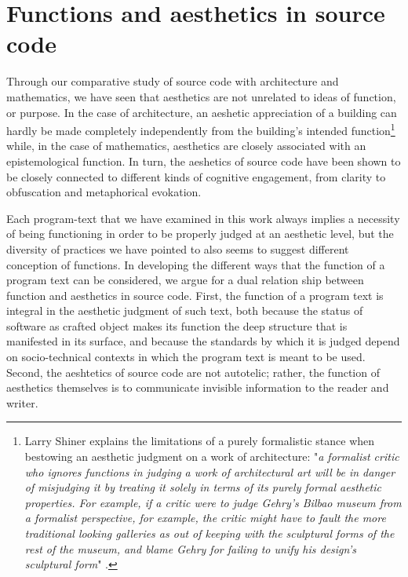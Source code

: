 \section{Functions and aesthetics in source code} 
\label{sec:functions-aesthetics-source-code}

Through our comparative study of source code with architecture and mathematics, we have seen that aesthetics are not unrelated to ideas of function, or purpose. In the case of architecture, an aeshetic appreciation of a building can hardly be made completely independently from the building's intended function\footnote{Larry Shiner explains the limitations of a purely formalistic stance when bestowing an aesthetic judgment on a work of architecture: "\emph{a formalist critic who ignores functions in judging a work of architectural art will be in danger of misjudging it by treating it solely in terms of its purely formal aesthetic properties. For example, if a critic were to judge Gehry's Bilbao museum from a formalist perspective, for example, the critic might have to fault the more traditional looking galleries as out of keeping with the sculptural forms of the rest of the museum, and blame Gehry for failing to unify his design's sculptural form}" \citep{shiner_functional_2009}.} while, in the case of mathematics, aesthetics are closely associated with an epistemological function. In turn, the aeshetics of source code have been shown to be closely connected to different kinds of cognitive engagement, from clarity to obfuscation and metaphorical evokation.

Each program-text that we have examined in this work always implies a necessity of being functioning in order to be properly judged at an aesthetic level, but the diversity of practices we have pointed to also seems to suggest different conception of functions. In developing the different ways that the function of a program text can be considered, we argue for a dual relation ship between function and aesthetics in source code. First, the function of a program text is integral in the aesthetic judgment of such text, both because the status of software as crafted object makes its function the deep structure that is manifested in its surface, and because the standards by which it is judged depend on socio-technical contexts in which the program text is meant to be used. Second, the aeshtetics of source code are not autotelic; rather, the function of aesthetics themselves is to communicate invisible information to the reader and writer.

